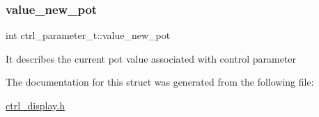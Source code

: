 \subsubsection{\texorpdfstring{value\+\_\+new\+\_\+pot}{value\_new\_pot}}
{\footnotesize\ttfamily int ctrl\+\_\+parameter\+\_\+t\+::value\+\_\+new\+\_\+pot}

It describes the current pot value associated with control parameter 

The documentation for this struct was generated from the following file\+:\begin{DoxyCompactItemize}
\item 
\hyperlink{ctrl__display_8h}{ctrl\+\_\+display.\+h}\end{DoxyCompactItemize}
